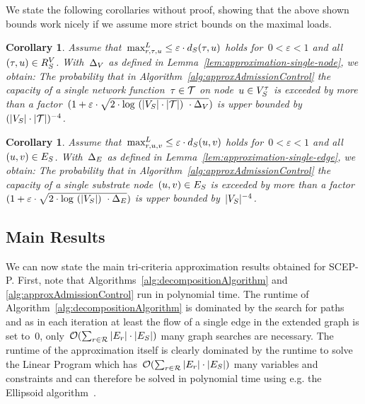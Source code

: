 \documentclass[10pt, conference, letterpaper]{IEEEtran}
\newtheorem{corollary}[theorem]{Corollary}
\begin{document}
We state the following corollaries  without proof, showing that the above shown bounds work nicely if we assume more strict bounds on the maximal loads.

\begin{corollary}
Assume that~$\maxLoadV \leq \varepsilon \cdot \Scap(\type,u)$ holds for~$0 < \varepsilon < 1$ and all~$(\tau,u) \in  R^V_{S}$. With~$\Delta_V$ as defined in Lemma~\ref{lem:approximation-single-node}, we obtain:
The probability that in Algorithm~\ref{alg:approxAdmissionControl} the capacity of a single network function~$\tau \in \mathcal{T}$ on node~$u \in V^{\tau}_{S}$ is exceeded by more than a factor~$(1+ \varepsilon \cdot \sqrt{2\cdot \log~(|V_S|\cdot|\mathcal{T}|)~\cdot \Delta_V})$ is upper bounded by~$(|V_S| \cdot |\mathcal{T}|)^{-4}$.
\end{corollary}

\begin{corollary}
Assume that~$\maxLoadE \leq \varepsilon \cdot \Scap(u,v)$ holds for~$0 < \varepsilon < 1$ and all~$(u,v) \in  E_S$. With~$\Delta_E$ as defined in Lemma~\ref{lem:approximation-single-edge}, we obtain:
The probability that in Algorithm~\ref{alg:approxAdmissionControl} the capacity of a single substrate node~$(u,v) \in  E_S$ is exceeded by more than a factor~$(1+\varepsilon \cdot \sqrt{2\cdot \log~(|V_S|)~\cdot \Delta_E})$ is upper bounded by~$|V_S|^{-4}$.
\end{corollary}

\subsection{Main Results}
\label{sec:main-results-admission-control}

We can now state the main tri-criteria approximation results obtained for SCEP-P. First, note that Algorithms~\ref{alg:decompositionAlgorithm} and \ref{alg:approxAdmissionControl} run in polynomial time. The runtime of Algorithm~\ref{alg:decompositionAlgorithm} is dominated by the search for paths and as in each iteration at least the flow of a single edge in the extended graph is set to~$0$, only~$\mathcal{O}(\sum_{r \in \mathcal{R}} |E_{r}| \cdot |E_S|)$ many graph searches are necessary. The runtime of the approximation itself is clearly dominated by the runtime to solve the Linear Program which has~$\mathcal{O}(\sum_{r \in \mathcal{R}} |E_{r}| \cdot |E_S|)$ many variables and constraints and can therefore be solved in polynomial time using e.g. the Ellipsoid algorithm~\cite{matousek2007understanding}.
\end{document}
